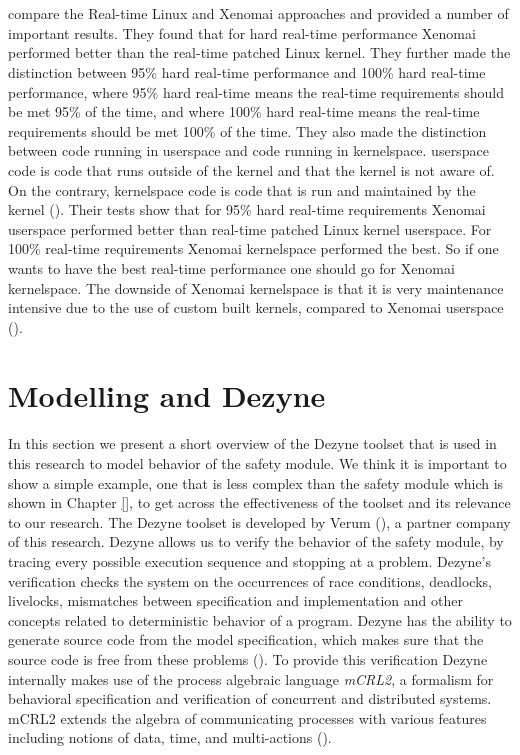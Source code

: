 \documentclass[12pt]{scrreprt}
\begin{document}
\\\\
\citeauthor{brown_martin} compare the Real-time Linux and Xenomai approaches and provided a number of important results. They found that for hard real-time performance Xenomai performed better than the real-time patched Linux kernel. They further made the distinction between 95\% hard real-time performance and 100\% hard real-time performance, where 95\% hard real-time means the real-time requirements should be met 95\% of the time, and where 100\% hard real-time means the real-time requirements should be met 100\% of the time. They also made the distinction between code running in userspace and code running in kernelspace. userspace code is code that runs outside of the kernel and that the kernel is not aware of. On the contrary, kernelspace code is code that is run and maintained by the kernel (\cite{blocking}). Their tests show that for 95\% hard real-time requirements Xenomai userspace performed better than real-time patched Linux kernel userspace. For 100\% real-time requirements Xenomai kernelspace performed the best. So if one wants to have the best real-time performance one should go for Xenomai kernelspace. The downside of Xenomai kernelspace is that it is very maintenance intensive due to the use of custom built kernels, compared to Xenomai userspace (\cite{brown_martin}).

\section{Modelling and Dezyne}
\label{Modelling and Dezyne}
In this section we present a short overview of the Dezyne toolset that is used in this research to model behavior of the safety module. We think it is important to show a simple example, one that is less complex than the safety module which is shown in Chapter \ref{}, to get across the effectiveness of the toolset and its relevance to our research. The Dezyne toolset is developed by Verum (\cite{verum}), a partner company of this research. Dezyne allows us to verify the behavior of the safety module, by tracing every possible execution sequence and stopping at a problem. Dezyne's verification checks the system on the occurrences of race conditions, deadlocks, livelocks, mismatches between specification and implementation and other concepts related to deterministic behavior of a program. Dezyne has the ability to generate source code from the model specification, which makes sure that the source code is free from these problems (\cite{dzntut}).
To provide this verification Dezyne internally makes use of the process algebraic language \textit{mCRL2}, a formalism for behavioral specification and verification of concurrent and distributed systems. mCRL2 extends the algebra of communicating processes with various features including notions of data, time, and multi-actions (\cite{mcrl2}).
\end{document}
